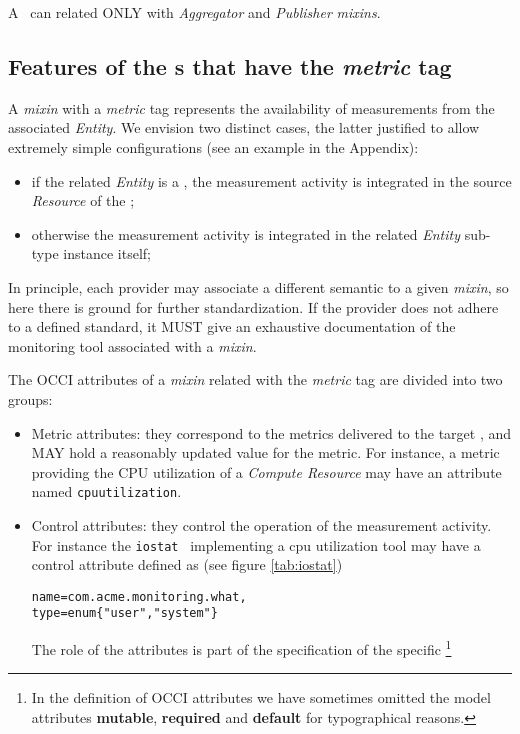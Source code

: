 \documentclass[12pt]{article}  %
\begin{document}
A \sens\ can related ONLY with {\em Aggregator} and {\em Publisher} {\em mixins}.



\subsection{Features of the \mi s that have the {\em metric} tag \label{sec:Tool}}

A {\em mixin} with a {\em metric} tag represents the availability of measurements from the associated {\em Entity}. We envision two distinct cases, the latter justified to allow extremely simple configurations (see an example in the Appendix):
\begin{itemize}
\item if the related {\em Entity} is a \coll, the measurement activity is integrated in the source {\em Resource} of the \coll;
\item otherwise the measurement activity is integrated in the related {\em Entity} sub-type instance itself;
\end{itemize} 

\newcommand{\misem}[1]{In principle, each provider may associate a different semantic to a given {\em mixin}, so here there is ground for further standardization. If the provider does not adhere to a defined standard, it MUST give an exhaustive documentation of #1 associated with a {\em mixin}.}

\misem{the monitoring tool}

The OCCI attributes of a {\em mixin} related with the {\em metric} tag are divided into two groups:
\begin{itemize}

\item Metric attributes: they correspond to the metrics delivered to the target \sens, and MAY hold a reasonably updated value for the metric. For instance, a metric providing the CPU utilization of a {\em Compute Resource} may have an attribute named {\tt \small cpuutilization}. 

\item Control attributes: they control the operation of the measurement activity. For instance the {\tt \small iostat} \mi\ implementing a cpu utilization tool may have a control attribute defined as (see figure \ref{tab:iostat}) 

\begin{verbatim}
name=com.acme.monitoring.what,
type=enum{"user","system"}
\end{verbatim}

The role of the attributes is part of the specification of the specific \mi \footnote{In the definition of OCCI attributes we have sometimes omitted the model attributes {\bf mutable}, {\bf required} and {\bf default} for typographical reasons.}

\end{itemize}
\end{document}
